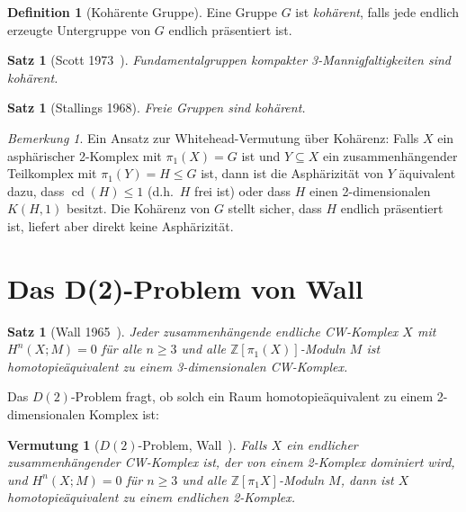 \documentclass[12pt,a4paper]{amsart}
\newtheorem{satz}[theorem]{Satz}
\newtheorem{vermutung}[theorem]{Vermutung}
\theoremstyle{definition}
\newtheorem{definition_de}[theorem]{Definition}
\theoremstyle{remark}
\newtheorem{bemerkung}[theorem]{Bemerkung}
\newcommand{\Z}{\mathbb{Z}}
\DeclareMathOperator{\cd}{cd}
\begin{document}
\begin{definition_de}[Kohärente Gruppe]
Eine Gruppe $G$ ist \emph{kohärent}, falls jede endlich erzeugte Untergruppe
von $G$ endlich präsentiert ist.
\end{definition_de}

\begin{satz}[Scott 1973~\cite{Scott1973}]
Fundamentalgruppen kompakter 3-Mannigfaltigkeiten sind kohärent.
\end{satz}

\begin{satz}[Stallings 1968]
Freie Gruppen sind kohärent.
\end{satz}

\begin{bemerkung}
Ein Ansatz zur Whitehead-Vermutung über Kohärenz: Falls $X$ ein asphärischer
2-Komplex mit $\pi_1(X) = G$ ist und $Y \subseteq X$ ein zusammenhängender
Teilkomplex mit $\pi_1(Y) = H \leq G$ ist, dann ist die Asphärizität von $Y$
äquivalent dazu, dass $\cd(H) \leq 1$ (d.h.\ $H$ frei ist) oder dass $H$
einen 2-dimensionalen $K(H,1)$ besitzt. Die Kohärenz von $G$ stellt sicher,
dass $H$ endlich präsentiert ist, liefert aber direkt keine Asphärizität.
\end{bemerkung}

\section{Das D(2)-Problem von Wall}

\begin{satz}[Wall 1965~\cite{Wall1965}]
Jeder zusammenhängende endliche CW-Komplex $X$ mit $H^n(X; M) = 0$
für alle $n \geq 3$ und alle $\Z[\pi_1(X)]$-Moduln $M$ ist
homotopieäquivalent zu einem 3-dimensionalen CW-Komplex.
\end{satz}

Das $D(2)$-Problem fragt, ob solch ein Raum homotopieäquivalent zu einem
2-dimensionalen Komplex ist:

\begin{vermutung}[$D(2)$-Problem, Wall~\cite{Wall1965}]
\label{verm:D2}
Falls $X$ ein endlicher zusammenhängender CW-Komplex ist, der von einem
2-Komplex dominiert wird, und $H^n(X; M) = 0$ für $n \geq 3$ und alle
$\Z[\pi_1 X]$-Moduln $M$, dann ist $X$ homotopieäquivalent zu einem
endlichen 2-Komplex.
\end{vermutung}
\end{document}
